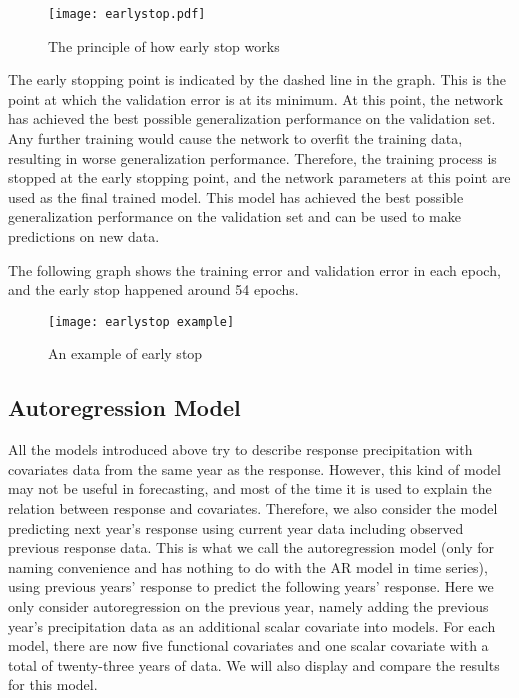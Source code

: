 \begin{description}
\begin{figure}[H] %
\centering %
\texttt{[image: earlystop.pdf]} %
\caption{The principle of how early stop works} %
\label{fig:earlystop} %
\end{figure}

The early stopping point is indicated by the dashed line in the graph. This is the point at which the validation error is at its minimum. At this point, the network has achieved the best possible generalization performance on the validation set. Any further training would cause the network to overfit the training data, resulting in worse generalization performance. Therefore, the training process is stopped at the early stopping point, and the network parameters at this point are used as the final trained model. This model has achieved the best possible generalization performance on the validation set and can be used to make predictions on new data.
\end{description}
The following graph shows the training error and validation error in each epoch, and the early stop happened around 54 epochs.

\begin{figure}[H] %
\centering %
\texttt{[image: earlystop example]} %
\caption{An example of early stop} %
\label{fig:early stop example} %
\end{figure}

\subsection{Autoregression Model}
All the models introduced above try to describe response precipitation with covariates data from the same year as the response. However, this kind of model may not be useful in forecasting, and most of the time it is used to explain the relation between response and covariates. Therefore, we also consider the model predicting next year's response using current year data including observed previous response data. This is what we call the autoregression model (only for naming convenience and has nothing to do with the AR model in time series), using previous years’ response to predict the following years’ response. Here we only consider autoregression on the previous year, namely adding the previous year’s precipitation data as an additional scalar covariate into models. For each model, there are now five functional covariates and one scalar covariate with a total of twenty-three years of data. We will also display and compare the results for this model.

